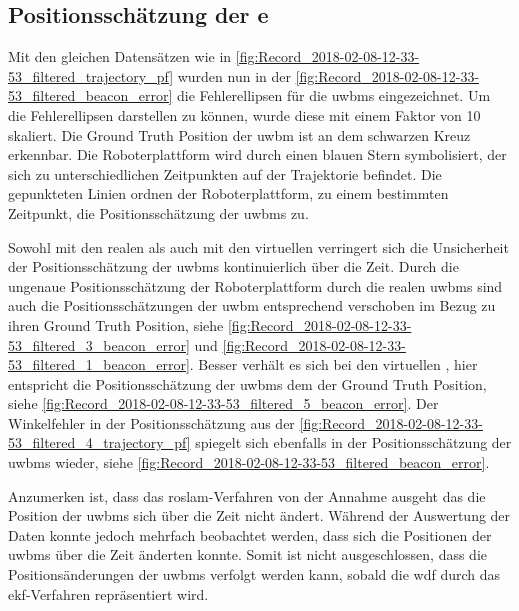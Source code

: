 %
%
%
\subsection{Positionsschätzung der e}

Mit den gleichen Datensätzen wie in \autoref{fig:Record_2018-02-08-12-33-53_filtered_trajectory_pf} wurden nun in der \autoref{fig:Record_2018-02-08-12-33-53_filtered_beacon_error} die Fehlerellipsen für die \glspl{uwbm} eingezeichnet. Um die Fehlerellipsen darstellen zu können, wurde diese mit einem Faktor von 10 skaliert. Die Ground Truth Position der \gls{uwbm} ist an dem schwarzen Kreuz erkennbar. Die Roboterplattform wird durch einen blauen Stern symbolisiert, der sich zu unterschiedlichen Zeitpunkten auf der Trajektorie befindet. Die gepunkteten Linien ordnen der Roboterplattform, zu einem bestimmten Zeitpunkt, die Positionsschätzung der \glspl{uwbm} zu.

Sowohl mit den realen als auch mit den virtuellen  verringert sich die Unsicherheit der Positionsschätzung der \glspl{uwbm} kontinuierlich über die Zeit. Durch die ungenaue Positionsschätzung der Roboterplattform durch die realen \glspl{uwbm} sind auch die Positionsschätzungen der \gls{uwbm} entsprechend verschoben im Bezug zu ihren Ground Truth Position, siehe \autoref{fig:Record_2018-02-08-12-33-53_filtered_3_beacon_error} und \autoref{fig:Record_2018-02-08-12-33-53_filtered_1_beacon_error}. Besser verhält es sich bei den virtuellen , hier entspricht die Positionsschätzung der \glspl{uwbm} dem der Ground Truth Position, siehe \autoref{fig:Record_2018-02-08-12-33-53_filtered_5_beacon_error}. Der Winkelfehler in der Positionsschätzung aus der \autoref{fig:Record_2018-02-08-12-33-53_filtered_4_trajectory_pf} spiegelt sich ebenfalls in der Positionsschätzung der \glspl{uwbm} wieder, siehe \autoref{fig:Record_2018-02-08-12-33-53_filtered_beacon_error}.

Anzumerken ist, dass das \gls{roslam}-Verfahren von der Annahme ausgeht das die Position der \glspl{uwbm} sich über die Zeit nicht ändert. Während der Auswertung der Daten konnte jedoch mehrfach beobachtet werden, dass sich die Positionen der \glspl{uwbm} über die Zeit änderten konnte. Somit ist nicht ausgeschlossen, dass die Positionsänderungen der \glspl{uwbm} verfolgt werden kann, sobald die \gls{wdf} durch das \gls{ekf}-Verfahren repräsentiert wird.

